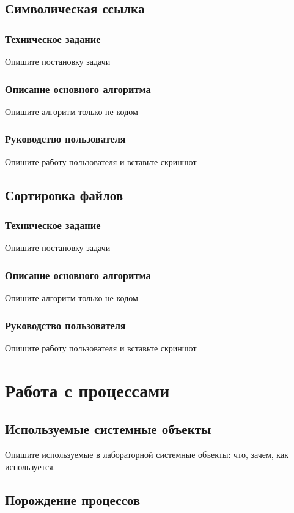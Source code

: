 \documentclass[a4paper,14pt]{extarticle}
\begin{document}
\subsection{Символическая ссылка}
\subsubsection{Техническое задание}
Опишите постановку задачи

\subsubsection{Описание основного алгоритма}
Опишите алгоритм только не кодом

\subsubsection{Руководство пользователя}
Опишите работу пользователя и вставьте скриншот

\subsection{Сортировка файлов}
\subsubsection{Техническое задание}
Опишите постановку задачи

\subsubsection{Описание основного алгоритма}
Опишите алгоритм только не кодом

\subsubsection{Руководство пользователя}
Опишите работу пользователя и вставьте скриншот
\newpage

\section{Работа с процессами}
\subsection{Используемые системные объекты}
Опишите используемые в лабораторной системные объекты: что, зачем, как используется.

\subsection{Порождение процессов}
\end{document}
